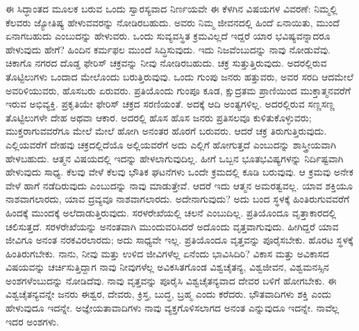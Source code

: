 ಈ ಸಿದ್ಧಾಂತದ ಮೂಲಕ ಬರುವ ಒಂದು ಸ್ವಾರಸ್ಯವಾದ ನಿರ್ಣಯವೇ ಈ ಕೆಳಗಿನ ವಿಷಯಗಳ ವಿವರಣೆ: ನಿಮ್ಮಲ್ಲಿ ಕೆಲವರು ಜ್ಯೋತಿಷ್ಯ ಹೇಳುವವರನ್ನು ನೋಡಿರಬಹುದು. ಅವರು ನಿಮ್ಮ ಜೀವನದಲ್ಲಿ ಹಿಂದೆ ಏನಾಯಿತು, ಮುಂದೆ ಏನಾಗಬಹುದು ಎಂಬುದನ್ನು ಹೇಳುವರು. ಒಂದು ಸುವ್ಯವಸ್ಥಿತ ಕ್ರಮವಿಲ್ಲದೆ ಇದ್ದರೆ ಯಾರ ಭವಿಷ್ಯವನ್ನಾದರೂ ಹೇಳುವುದು ಹೇಗೆ? ಹಿಂದಿನ ಕರ್ಮಫಲ ಮುಂದೆ ಸಿದ್ಧಿಸುವುದು. ಇದು ನಿಜವೆಂಬುದನ್ನು ನಾವು ನೋಡುವೆವು. ಚಿಕಾಗೊ ನಗರದ ದೊಡ್ಡ ಫೇರಿಸ್​ ಚಕ್ರವನ್ನು ನೀವು ನೋಡಿರಬಹುದು. ಚಕ್ರ ಸುತ್ತುತ್ತಿರುವುದು. ಅದರಲ್ಲಿರುವ ತೊಟ್ಟಿಲುಗಳು ಒಂದಾದ ಮೇಲೊಂದು ಬರುತ್ತಿರುವುವು. ಒಂದು ಗುಂಪು ಜನರು ಹತ್ತುವರು, ಅವರ ಸರದಿ ಆದಮೇಲೆ ಅವರಿಳಿಯುವರು, ಹೊಸಬರು ಏರುವರು. ಪ್ರತಿಯೊಂದು ಗುಂಪೂ ಕೂಡ, ಕ್ಷುದ್ರತಮ ಪ್ರಾಣಿಯಿಂದ ಮುಕ್ತಾತ್ಮನವರೆಗೆ ಇರುವ ಅಭಿವ್ಯಕ್ತಿ. ಪ್ರಕೃತಿಯೇ ಫೇರಿಸ್​ ಚಕ್ರದ ಸರಣಿಯಂತೆ. ಅದಕ್ಕೆ ಆದಿ ಅಂತ್ಯಗಳಿಲ್ಲ. ಅದರಲ್ಲಿರುವ ಸಣ್ಣಸಣ್ಣ ತೊಟ್ಟಿಲುಗಳೇ ದೇಹ ಅಥವಾ ಆಕಾರ. ಅದರಲ್ಲಿ ಹೊಸ ಹೊಸ ಜನರು ಪ್ರತಿಸಲವೂ ಕುಳಿತುಕೊಳ್ಳುವರು; ಮುಕ್ತರಾಗುವವರೆಗೂ ಮೇಲೆ ಮೇಲೆ ಹೋಗಿ ಅನಂತರ ಹೊರಗೆ ಬರುವರು. ಆದರೆ ಚಕ್ರ ತಿರುಗುತ್ತಿರುವುದು. ಎಲ್ಲಿಯವರೆಗೆ ದೇಹವು ಚಕ್ರದಲ್ಲಿದೆಯೊ ಅಲ್ಲಿಯವರೆಗೆ ಅದು ಎಲ್ಲಿಗೆ ಹೋಗುತ್ತದೆ ಎಂಬುದನ್ನು ಶಾಸ್ತ್ರೀಯವಾಗಿ ಹೇಳಬಹುದು. ಆತ್ಮನ ವಿಷಯದಲ್ಲಿ ಇದನ್ನು ಹೇಳಲಾಗುವುದಿಲ್ಲ. ಹೀಗೆ ಒಬ್ಬನ ಭೂತಭವಿಷ್ಯಗಳನ್ನು ನಿರ್ದಿಷ್ಟವಾಗಿ ಹೇಳುವುದು ಸಾಧ್ಯ. ಕೆಲವು ವೇಳೆ ಕೆಲವು ಭೌತಿಕ ಘಟನೆಗಳು ಒಂದೇ ಕ್ರಮದಲ್ಲಿ ಕೂಡಿ ಬರುವುವು. ಆ ಕ್ರಮವು ಅನೇಕ ವೇಳೆ ಹಾಗೆ ನಡೆದಿರುವುದು ಎಂಬುದನ್ನು ನಾವು ಮಾಡುತ್ತೇವೆ. ಆದರೆ ಇದು ಆತ್ಮನ ಅಮರತ್ವವಲ್ಲ. ಯಾವ ಶಕ್ತಿಯೂ ನಾಶವಾಗಲಾರದು, ಯಾವ ದ್ರವ್ಯವೂ ನಾಶವಾಗಲಾರದು. ಅದೇನಾಗುವುದು? ಅದು ಬಂದ ಸ್ಥಳಕ್ಕೆ ಹಿಂತಿರುಗುವವರೆಗೆ ಹಿಂದಕ್ಕೆ ಮುಂದಕ್ಕೆ ಅಲೆದಾಡುತ್ತಿರುವುದು. ಸರಳರೇಖೆಯಲ್ಲಿ ಚಲನೆ ಎಂಬುದಿಲ್ಲ. ಪ್ರತಿಯೊಂದೂ ವೃತ್ತಾಕಾರದಲ್ಲಿ ಚಲಿಸುತ್ತದೆ. ಸರಳರೇಖೆಯನ್ನು ಅನಂತವಾಗಿ ಮುಂದುವರಿಸಿದರೆ ಅದೊಂದು ವೃತ್ತವಾಗುವುದು. ಹೀಗಿದ್ದರೆ ಯಾವ ಜೀವಿಗೂ ಅನಂತ ನರಕವಿರಲಾರದು; ಅದು ಸಾಧ್ಯವೇ ಇಲ್ಲ. ಪ್ರತಿಯೊಂದೂ ವೃತ್ತವನ್ನು ಪೂರೈಸಬೇಕು. ಹೊರಟ ಸ್ಥಳಕ್ಕೆ ಹಿಂತಿರುಗಬೇಕು. ನಾನು, ನೀವು ಮತ್ತು ಉಳಿದ ಜೀವಿಗಳೆಲ್ಲ ಏನೆಂದು ಭಾವಿಸಿದಿರಿ? ವಿಕಾಸ ಮತ್ತು ಅವಿಕಾಸದ ವಿಷಯವನ್ನು ಚರ್ಚಿಸುತ್ತಿದ್ದಾಗ ನಾವು ನೀವುಗಳೆಲ್ಲ ಅವಿಕಸಿತಗೊಂಡ ವಿಶ್ವಚೈತನ್ಯ, ವಿಶ್ವಜೀವನ, ವಿಶ್ವಮನಸ್ಸಿನ ಅಂಶಗಳೆಂಬುದನ್ನು ನೋಡಿದೆವು. ನಾವು ವೃತ್ತವನ್ನು ಪೂರೈಸಿ ವಿಶ್ವಚೈತನ್ಯವಾದ ದೇವರ ಬಳಿಗೆ ಹೋಗಬೇಕು. ಈ ವಿಶ್ವಚೈತನ್ಯವನ್ನೇ ಜನರು ಈಶ್ವರ, ದೇವರು, ಕ್ರಿಸ್ತ, ಬುದ್ಧ, ಬ್ರಹ್ಮ ಎಂದು ಕರೆದರು. ಭೌತವಾದಿಗಳು ಶಕ್ತಿ ಎಂದು ಹೇಳುವುದೂ ಇದನ್ನೇ. ಅಜ್ಞೇಯತಾವಾದಿಗಳು ನಾವು ವ್ಯಕ್ತಗೊಳಿಸಲಾಗದ ಅನಂತ ಎನ್ನುವುದೂ ಇದನ್ನೇ. ನಾವೆಲ್ಲ ಇದರ ಅಂಶಗಳು.

